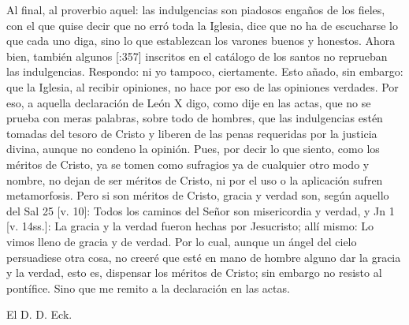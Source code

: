Al final, al proverbio aquel: las indulgencias son piadosos engaños de los fieles, con el que quise decir que no erró toda la Iglesia, dice que no ha de escucharse lo que cada uno diga, sino lo que establezcan los varones buenos y honestos. Ahora bien, también algunos [:357] inscritos en el catálogo de los santos no reprueban las indulgencias. Respondo: ni yo tampoco, ciertamente. Esto añado, sin embargo: que la Iglesia, al recibir opiniones, no hace por eso de las opiniones verdades. Por eso, a aquella declaración de León X digo, como dije en las actas, que no se prueba con meras palabras, sobre todo de hombres, que las indulgencias estén tomadas del tesoro de Cristo y liberen de las penas requeridas por la justicia divina, aunque no condeno la opinión. Pues, por decir lo que siento, como los méritos de Cristo, ya se tomen como sufragios ya de cualquier otro modo y nombre, no dejan de ser méritos de Cristo, ni por el uso o la aplicación sufren metamorfosis. Pero si son méritos de Cristo, gracia y verdad son, según aquello del Sal 25 [v. 10]: Todos los caminos del Señor son misericordia y verdad, y Jn 1 [v. 14ss.]: La gracia y la verdad fueron hechas por Jesucristo; allí mismo: Lo vimos lleno de gracia y de verdad. Por lo cual, aunque un ángel del cielo persuadiese otra cosa, no creeré que esté en mano de hombre alguno dar la gracia y la verdad, esto es, dispensar los méritos de Cristo; sin embargo no resisto al pontífice. Sino que me remito a la declaración en las actas.

El D. D. Eck.

